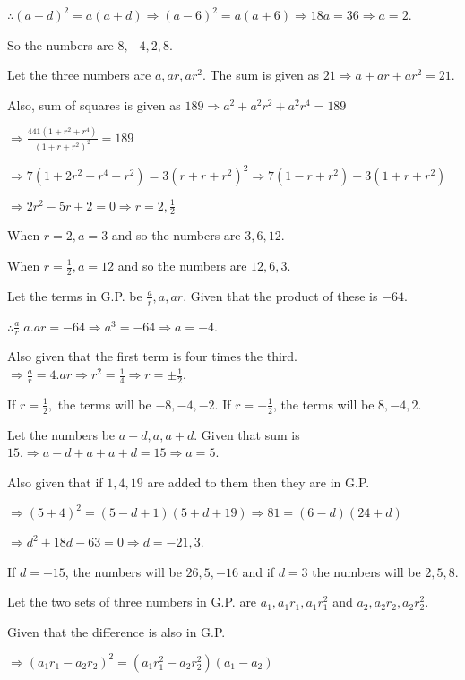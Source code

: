   $\therefore (a - d)^2 = a(a + d)\Rightarrow (a - 6)^2 = a(a + 6) \Rightarrow 18a = 36 \Rightarrow a = 2$.

  So the numbers are $8, -4, 2, 8$.
\item Let the three numbers are $a, ar, ar^2$. The sum is given as $21 \Rightarrow a + ar + ar^2 = 21$.

  Also, sum of squares is given as $189 \Rightarrow a^2 + a^2r^2 + a^2r^4 = 189$

  $\Rightarrow \frac{441(1 + r^2 + r^4)}{(1 + r + r^2)^2} = 189$

  $\Rightarrow 7(1 + 2r^2 + r^4 - r^2) = 3(r + r + r^2)^2 \Rightarrow 7(1 - r + r^2) - 3(1 + r + r^2)$

  $\Rightarrow 2r^2 - 5r + 2 = 0 \Rightarrow r = 2, \frac{1}{2}$

  When $r = 2, a = 3$ and so the numbers are $3, 6, 12$.

  When $r = \frac{1}{2}, a = 12$ and so the numbers are $12, 6, 3$.
\item Let the terms in G.P. be $\frac{a}{r}, a, ar$. Given that the product of these is $-64$.

  $\therefore \frac{a}{r}.a.ar = -64 \Rightarrow a^3 = -64 \Rightarrow a = -4$.

  Also given that the first term is four times the third. $\Rightarrow \frac{a}{r} = 4.ar \Rightarrow r^2 = \frac{1}{4} \Rightarrow r = \pm\frac{1}{2}$.

  If $r = \frac{1}{2},$ the terms will be $-8, -4, -2$. If $r = -\frac{1}{2}$, the terms will be $8, -4, 2$.
\item Let the numbers be $a - d, a, a + d$. Given that sum is $15. \Rightarrow a - d + a + a + d = 15 \Rightarrow a = 5$.

  Also given that if $1, 4, 19$ are added to them then they are in G.P.

  $\Rightarrow (5 + 4)^2 = (5 - d + 1)(5 + d + 19) \Rightarrow 81 = (6 - d)(24 + d)$

  $\Rightarrow d^2 + 18d - 63 = 0 \Rightarrow d = -21, 3$.

  If $d = -15$, the numbers will be $26, 5, -16$ and if $d = 3$ the numbers will be $2, 5, 8$.
\item Let the two sets of three numbers in G.P. are $a_1, a_1r_1, a_1r_1^2$ and $a_2, a_2r_2, a_2r_2^2$.

  Given that the difference is also in G.P.

  $\Rightarrow (a_1r_1 - a_2r_2)^2 = (a_1r_1^2 - a_2r_2^2)(a_1 - a_2)$

